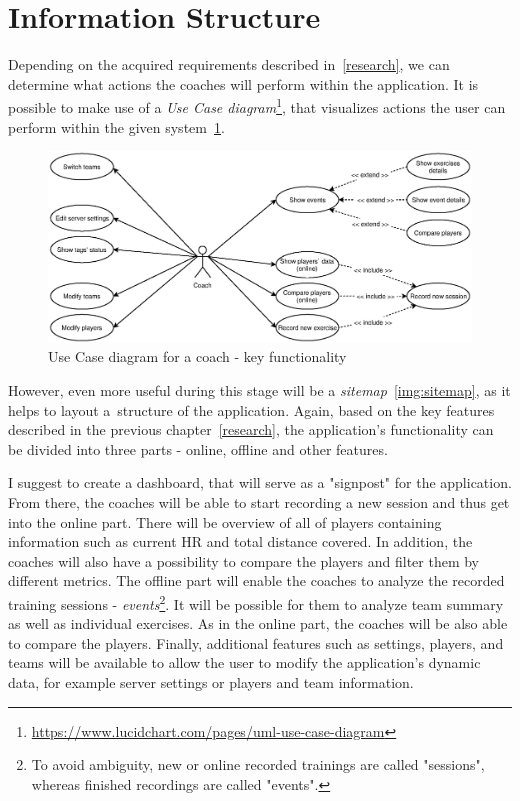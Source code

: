 \section{Information Structure}
Depending on the acquired requirements described in~\ref{research}, we can determine what actions the coaches will perform within the application. It is possible to make use of a \textit{Use Case diagram}\footnote{\url{https://www.lucidchart.com/pages/uml-use-case-diagram}}, that visualizes actions the user can perform within the given system~\ref{img:use_case}.

\begin{figure}[htb]
\begin{center}
  \includegraphics*[width=14cm,keepaspectratio,trim={0 9cm 0 9cm}]{images/use_case}
\end{center}
\caption{Use Case diagram for a coach - key functionality}
\label{img:use_case}
\end{figure}

However, even more useful during this stage will be a \textit{sitemap}~\ref{img:sitemap}, as it helps to layout a~structure of the application. Again, based on the key features described in the previous chapter~\ref{research}, the application’s functionality can be divided into three parts - online, offline and other features.

I suggest to create a dashboard, that will serve as a "signpost" for the application. From there, the coaches will be able to start recording a new session and thus get into the online part. There will be overview of all of players containing information such as current HR and total distance covered. In addition, the coaches will also have a possibility to compare the players and filter them by different metrics. The offline part will enable the coaches to analyze the recorded training sessions - \textit{events}\footnote{To avoid ambiguity, new or online recorded trainings are called "sessions", whereas finished recordings are called "events".}. It will be possible for them to analyze team summary as well as individual exercises. As in the online part, the coaches will be also able to compare the players. Finally, additional features such as settings, players, and teams will be available to allow the user to modify the application’s dynamic data, for example server settings or players and team information.

